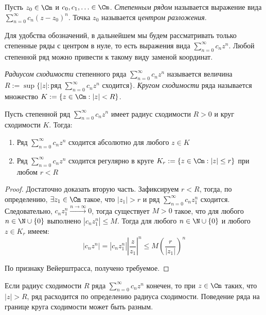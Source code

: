 \begin{definition}
	Пусть $z_0 \in \Cm$ и $c_0, c_1, \dotsc \in \Cm$. \textit{Степенным рядом} называется выражение вида $\sum_{n=0}^\infty c_n(z - z_0)^n$. Точка $z_0$ называется \textit{центром разложения}.
\end{definition}

\begin{note}
	Для удобства обозначений, в дальнейшем мы будем рассматривать только степенные ряды с центром в нуле, то есть выражения вида $\sum_{n=0}^\infty c_nz^n$. Любой степенной ряд можно привести к такому виду заменой координат.
\end{note}

\begin{definition}
	\textit{Радиусом сходимости} степенного ряда $\sum_{n=0}^\infty c_nz^n$ называется величина $R := \sup\{|z| : \text{ряд }\sum_{n=0}^\infty c_nz^n\text{ сходится}\}$. \textit{Кругом сходимости} ряда называется множество $K := \{z \in \Cm : |z| < R\}$.
\end{definition}

\begin{theorem}[Абеля]
	Пусть степенной ряд $\sum_{n=0}^\infty c_nz^n$ имеет радиус сходимости $R > 0$ и круг сходимости $K$. Тогда:
	\begin{enumerate}
		\item Ряд $\sum_{n=0}^\infty c_nz^n$ сходится абсолютно для любого $z \in K$
		\item Ряд $\sum_{n=0}^\infty c_nz^n$ сходится регулярно в круге $K_r := \{z \in \Cm: |z| \le r\}$ при любом $r < R$
	\end{enumerate}
\end{theorem}

\begin{proof}
	Достаточно доказать вторую часть. Зафиксируем $r < R$, тогда, по определению, $\exists z_1 \in \Cm$ такое, что $|z_1| > r$ и ряд $\sum_{n=0}^\infty c_nz_1^n$ сходится. Следовательно, $c_nz_1^n \xrightarrow{n \to \infty} 0$, тогда существует $M > 0$ такое, что для любого $n \in \N \cup \{0\}$ выполнено $|c_nz_1^n| \le M$. Тогда для любого $n \in \N \cup \{0\}$ и любого $z \in K_r$ имеем:
	\[\left|c_nz^n\right| = \left|c_nz_1^n\right|\left|\frac{z}{z_1}\right|^n \le M\left(\frac{r}{|z_1|}\right)^n\]
	
	По признаку Вейерштрасса, получено требуемое.
\end{proof}

\begin{note}
	Если радиус сходимости $R$ ряда $\sum_{n=0}^\infty c_nz^n$ конечен, то при $z \in \Cm$ таких, что $|z| > R$, ряд расходится по определению радиуса сходимости. Поведение ряда на границе круга сходимости может быть разным.
\end{note}

